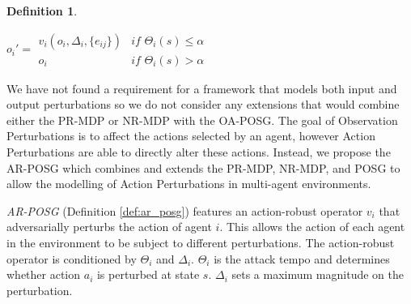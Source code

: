 \documentclass[conference,compsoc]{IEEEtran}
\newtheorem{definition}{Definition}
\begin{document}
\begin{definition}
\begin{itemize}
    $o_i' = \begin{array}{lr}
         v_i(o_i, \Delta_i, \{e_{ij}\}) & \textit{if } \Theta_i(s) \leq \alpha \\
         o_i & \textit{if } \Theta_i(s) > \alpha
    \end{array}$
\end{itemize}
\label{def:oa_posg}
\end{definition}


We have not found a requirement for a framework that models both input and output perturbations so we do not consider any extensions that would combine either the PR-MDP or NR-MDP with the OA-POSG. The goal of Observation Perturbations is to affect the actions selected by an agent, however Action Perturbations are able to directly alter these actions. Instead, we propose the AR-POSG which combines and extends the PR-MDP, NR-MDP, and POSG to allow the modelling of Action Perturbations in multi-agent environments. 

\textit{AR-POSG} (Definition \ref{def:ar_posg}) features an action-robust operator $v_i$ that adversarially perturbs the action of agent $i$. This allows the action of each agent in the environment to be subject to different perturbations. The action-robust operator is conditioned by $\Theta_i$ and $\Delta_i$. $\Theta_i$ is the attack tempo and determines whether action $a_i$ is perturbed at state $s$. $\Delta_i$ sets a maximum magnitude on the perturbation. 
\end{document}
